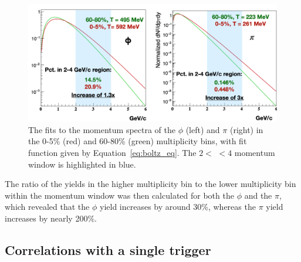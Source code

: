 \begin{figure}[ht]
    \centering
    \includegraphics[width=\textwidth]{figures/analysis/phi_pi_radial_flow.png}
    \caption{The fits to the momentum spectra of the $\phi$ (left) and $\pi$ (right) in the 0-5\% (red) and 60-80\% (green) multiplicity bins, with fit function given by Equation~\ref{eq:boltz_eq}. The $2 <$ \pt $< 4$ \GeVc momentum window is highlighted in blue.}
    \label{fig:phi_pi_radial_flow}
\end{figure}

The ratio of the yields in the higher multiplicity bin to the lower multiplicity bin within the momentum window was then calculated for both the $\phi$ and the $\pi$, which revealed that the $\phi$ yield increases by around 30\%, whereas the $\pi$ yield increases by nearly 200\%.



\subsection{Correlations with a single trigger}
\label{sec:single_trigger_correlations}

